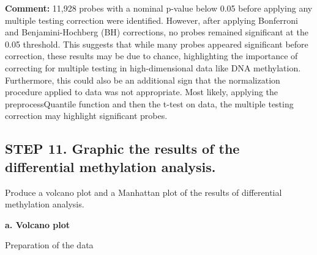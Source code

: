 \documentclass[
  11pt,
]{article}
\newenvironment{Shaded}{\begin{snugshade}}{\end{snugshade}}
\newcommand{\AttributeTok}[1]{\textcolor[rgb]{0.13,0.29,0.53}{#1}}
\newcommand{\DecValTok}[1]{\textcolor[rgb]{0.00,0.00,0.81}{#1}}
\newcommand{\FunctionTok}[1]{\textcolor[rgb]{0.13,0.29,0.53}{\textbf{#1}}}
\newcommand{\NormalTok}[1]{#1}
\newcommand{\OtherTok}[1]{\textcolor[rgb]{0.56,0.35,0.01}{#1}}
\newcommand{\SpecialCharTok}[1]{\textcolor[rgb]{0.81,0.36,0.00}{\textbf{#1}}}
\newcommand{\StringTok}[1]{\textcolor[rgb]{0.31,0.60,0.02}{#1}}
\begin{document}
\textbf{Comment:} 11,928 probes with a nominal p-value below 0.05 before
applying any multiple testing correction were identified. However, after
applying Bonferroni and Benjamini-Hochberg (BH) corrections, no probes
remained significant at the 0.05 threshold. This suggests that while
many probes appeared significant before correction, these results may be
due to chance, highlighting the importance of correcting for multiple
testing in high-dimensional data like DNA methylation. Furthermore, this
could also be an additional sign that the normalization procedure
applied to data was not appropriate. Most likely, applying the
preprocessQuantile function and then the t-test on data, the multiple
testing correction may highlight significant probes.

\subsection{STEP 11. Graphic the results of the differential methylation
analysis.}\label{step-11.-graphic-the-results-of-the-differential-methylation-analysis.}

Produce a volcano plot and a Manhattan plot of the results of
differential methylation analysis.

\textbf{a. Volcano plot}

Preparation of the data

\begin{Shaded}
\end{Shaded}
\end{document}
